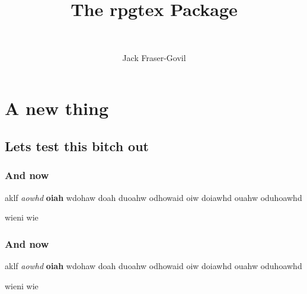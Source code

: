 \documentclass[11pt,theme=default]{rpgbook}
\title{The rpgtex Package}
\subtitle{~}
\author{Jack Fraser-Govil}
\begin{document}
	\frontmatter
	\maketitle{}

	\tableofcontents
	\mainmatter



	\part{A new thing}
		\chapter{Lets test this bitch out}

			\section{And now}

				 aklf \textit{aowhd} \textbf{oiah} wdohaw doah duoahw odhowaid oiw doiawhd ouahw oduhoawhd \Blindtext

				wieni wie
				 \Blindtext


			\section{And now}

				 aklf \textit{aowhd} \textbf{oiah} wdohaw doah duoahw odhowaid oiw doiawhd ouahw oduhoawhd \Blindtext

				wieni wie
				 \Blindtext
\end{document}
